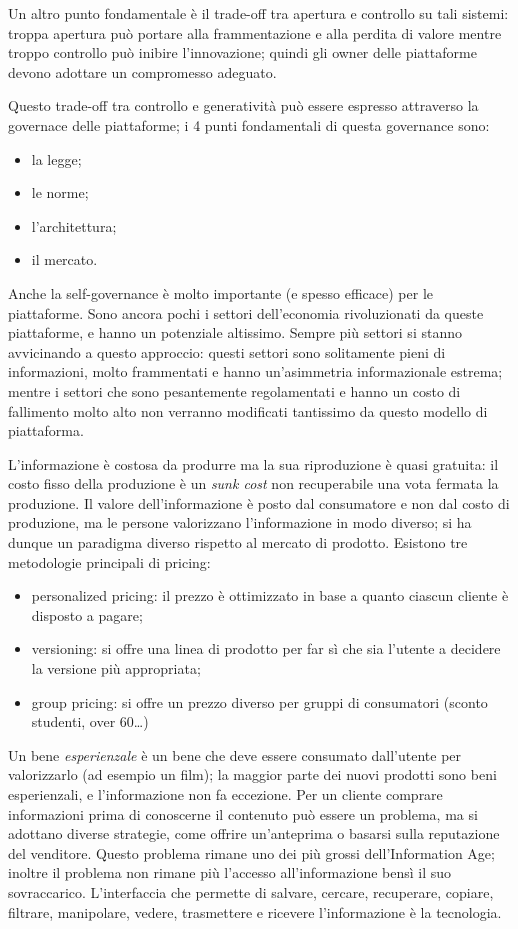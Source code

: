 \documentclass[a4page, 11pt]{article}
\begin{document}
Un altro punto fondamentale è il trade-off tra apertura e controllo su tali sistemi: troppa apertura può portare alla frammentazione e alla perdita di valore mentre troppo controllo può inibire l'innovazione; quindi gli owner delle piattaforme devono adottare un compromesso adeguato.

Questo trade-off tra controllo e generatività può essere espresso attraverso la governace delle piattaforme; i 4 punti fondamentali di questa governance sono:
\begin{itemize}
  \item la legge;
  \item le norme;
  \item l'architettura;
  \item il mercato.
\end{itemize}

Anche la self-governance è molto importante (e spesso efficace) per le piattaforme.
Sono ancora pochi i settori dell'economia rivoluzionati da queste piattaforme, e hanno un potenziale altissimo.
Sempre più settori si stanno avvicinando a questo approccio: questi settori sono solitamente pieni di informazioni, molto frammentati e hanno un'asimmetria informazionale estrema; mentre i settori che sono pesantemente regolamentati e hanno un costo di fallimento molto alto non verranno modificati tantissimo da questo modello di piattaforma.

L'informazione è costosa da produrre ma la sua riproduzione è quasi gratuita: il costo fisso della produzione è un \textit{sunk cost} non recuperabile una vota fermata la produzione.
Il valore dell'informazione è posto dal consumatore e non dal costo di produzione, ma le persone valorizzano l'informazione in modo diverso; si ha dunque un paradigma diverso rispetto al mercato di prodotto.
Esistono tre metodologie principali di pricing:
\begin{itemize}
\item personalized pricing: il prezzo è ottimizzato in base a quanto ciascun cliente è disposto a pagare;
\item versioning: si offre una linea di prodotto per far sì che sia l'utente a decidere la versione più appropriata;
\item group pricing: si offre un prezzo diverso per gruppi di consumatori (sconto studenti, over 60\ldots)
\end{itemize}

Un bene \textit{esperienzale} è un bene che deve essere consumato dall'utente per valorizzarlo (ad esempio un film); la maggior parte dei nuovi prodotti sono beni esperienzali, e l'informazione non fa eccezione.
Per un cliente comprare informazioni prima di conoscerne il contenuto può essere un problema, ma si adottano diverse strategie, come offrire un'anteprima o basarsi sulla reputazione del venditore.
Questo problema rimane uno dei più grossi dell'Information Age; inoltre il problema non rimane più l'accesso all'informazione bensì il suo sovraccarico.
L'interfaccia che permette di salvare, cercare, recuperare, copiare, filtrare, manipolare, vedere, trasmettere e ricevere l'informazione è la tecnologia.
\end{document}
